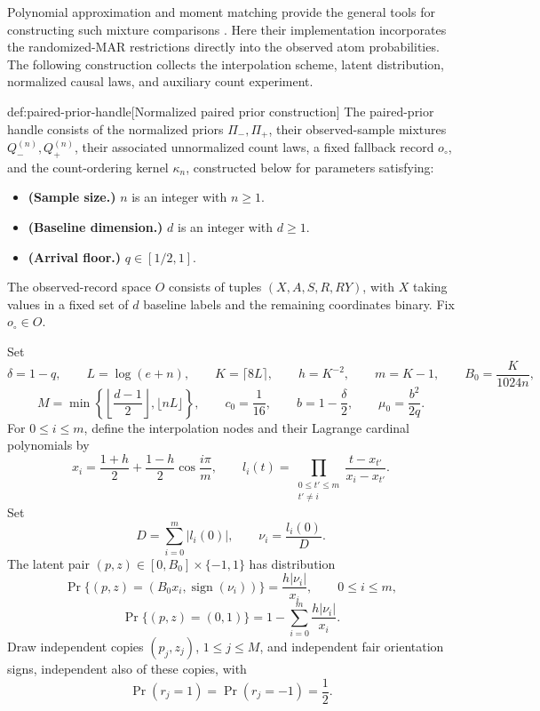 \documentclass[11pt]{article}
\begin{document}
Polynomial approximation and moment matching provide the general tools for constructing such mixture comparisons \citep{WuYang2016,Wu2020}. Here their implementation incorporates the randomized-MAR restrictions directly into the observed atom probabilities. The following construction collects the interpolation scheme, latent distribution, normalized causal laws, and auxiliary count experiment.

\begin{definitionv}{def:paired-prior-handle}[Normalized paired prior construction]
The paired-prior handle consists of the normalized priors \(\Pi_-,\Pi_+\), their observed-sample mixtures \(Q_-^{(n)},Q_+^{(n)}\), their associated unnormalized count laws, a fixed fallback record \(o_{\circ}\), and the count-ordering kernel \(\kappa_n\), constructed below for parameters satisfying:
\begin{itemize}
\item \textbf{(Sample size.)} \(n\) is an integer with \(n\ge1\).
\item \textbf{(Baseline dimension.)} \(d\) is an integer with \(d\ge1\).
\item \textbf{(Arrival floor.)} \(q\in[1/2,1]\).
\end{itemize}
The observed-record space \(O\) consists of tuples \((X,A,S,R,RY)\), with \(X\) taking values in a fixed set of \(d\) baseline labels and the remaining coordinates binary. Fix \(o_{\circ}\in O\).

Set
\[
\delta=1-q,\qquad
L=\log(e+n),\qquad
K=\lceil8L\rceil,\qquad
h=K^{-2},\qquad
m=K-1,\qquad
B_0=\frac{K}{1024n},
\]
\[
M=\min\left\{
\left\lfloor\frac{d-1}{2}\right\rfloor,
\lfloor nL\rfloor
\right\},
\qquad
c_0=\frac1{16},\qquad
b=1-\frac{\delta}{2},\qquad
\mu_0=\frac{b^2}{2q}.
\]
For \(0\le i\le m\), define the interpolation nodes and their Lagrange cardinal polynomials by
\[
x_i=\frac{1+h}{2}+\frac{1-h}{2}\cos\frac{i\pi}{m},
\qquad
l_i(t)=\prod_{\substack{0\le t'\le m\\t'\ne i}}
\frac{t-x_{t'}}{x_i-x_{t'}}.
\]
Set
\[
D=\sum_{i=0}^{m}|l_i(0)|,
\qquad
\nu_i=\frac{l_i(0)}{D}.
\]
The latent pair \((p,z)\in[0,B_0]\times\{-1,1\}\) has distribution
\[
\Pr\{(p,z)=(B_0x_i,\operatorname{sign}(\nu_i))\}
=\frac{h|\nu_i|}{x_i},
\qquad 0\le i\le m,
\]
\[
\Pr\{(p,z)=(0,1)\}
=1-\sum_{i=0}^{m}\frac{h|\nu_i|}{x_i}.
\]
Draw independent copies \((p_j,z_j)\), \(1\le j\le M\), and independent fair orientation signs, independent also of these copies, with
\[
\Pr(r_j=1)=\Pr(r_j=-1)=\frac12.
\]


\end{definitionv}
\end{document}
